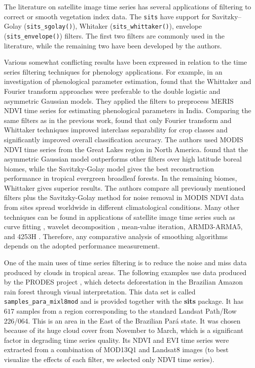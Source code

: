 \documentclass[a4paper,]{tufte-book}
\begin{document}
The literature on satellite image time series has several applications of filtering to correct or smooth vegetation index data. The \texttt{sits} have support for Savitzky--Golay (\texttt{sits\_sgolay()}), Whitaker (\texttt{sits\_whittaker()}), envelope (\texttt{sits\_envelope()}) filters. The first two filters are commonly used in the literature, while the remaining two have been developed by the authors.

Various somewhat conflicting results have been expressed in relation to the time series filtering techniques for phenology applications. For example, in an investigation of phenological parameter estimation, \citet{Atkinson2012} found that the Whittaker and Fourier transform approaches were preferable to the double logistic and asymmetric Gaussian models. They applied the filters to preprocess MERIS NDVI time series for estimating phenological parameters in India. Comparing the same filters as in the previous work, \citet{Shao2016} found that only Fourier transform and Whittaker techniques improved interclass separability for crop classes and significantly improved overall classification accuracy. The authors used MODIS NDVI time series from the Great Lakes region in North America. \citet{Zhou2016} found that the asymmetric Gaussian model outperforms other filters over high latitude boreal biomes, while the Savitzky-Golay model gives the best reconstruction performance in tropical evergreen broadleaf forests. In the remaining biomes, Whittaker gives superior results. The authors compare all previously mentioned filters plus the Savitzky-Golay method for noise removal in MODIS NDVI data from sites spread worldwide in different climatological conditions. Many other techniques can be found in applications of satellite image time series such as curve fitting \citep{Bradley2007}, wavelet decomposition \citep{Sakamoto2005}, mean-value iteration, ARMD3-ARMA5, and 4253H \citep{Hird2009}. Therefore, any comparative analysis of smoothing algorithms depends on the adopted performance measurement.

One of the main uses of time series filtering is to reduce the noise and miss data produced by clouds in tropical areas. The following examples use data produced by the PRODES project \citep{INPE2017}, which detects deforestation in the Brazilian Amazon rain forest through visual interpretation. This data set is called \texttt{samples\_para\_mixl8mod} and is provided together with the \textbf{sits} package. It has \(617\) samples from a region corresponding to the standard Landsat Path/Row 226/064. This is an area in the East of the Brazilian Pará state. It was chosen because of its huge cloud cover from November to March, which is a significant factor in degrading time series quality. Its NDVI and EVI time series were extracted from a combination of MOD13Q1 and Landsat8 images (to best visualize the effects of each filter, we selected only NDVI time series).
\end{document}
